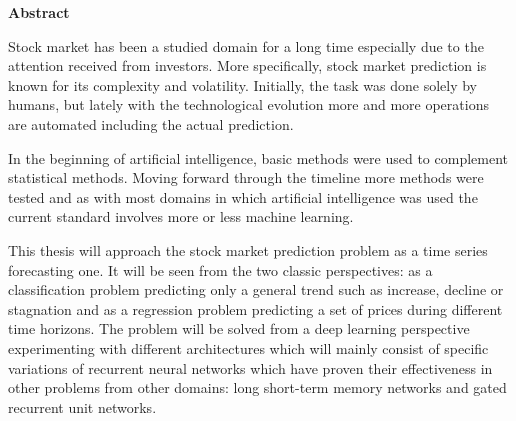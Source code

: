 \thispagestyle{plain}
\begin{center}
    \Large
    \textbf{Abstract}
\end{center}

Stock market has been a studied domain for a long time especially due to the
attention received from investors. More specifically, stock market prediction is known for its complexity and volatility. Initially, the task was done solely by humans, but lately with the technological evolution more and more operations are automated including the actual prediction.

In the beginning of artificial intelligence, basic methods were used to complement
statistical methods. Moving forward through the timeline more methods were tested and as with most domains in which artificial intelligence was used the current standard involves more or less machine learning. 

This thesis will approach the stock market prediction problem as a time series forecasting one. It will be seen from the two classic perspectives: as a classification problem predicting only a general trend such as increase, decline or stagnation and as a regression problem predicting a set of prices during different time horizons. The problem will be solved from a deep learning perspective experimenting with different architectures which will mainly consist of specific variations of recurrent neural networks which have proven their effectiveness in other problems from other domains: long short-term memory networks and gated recurrent unit networks.